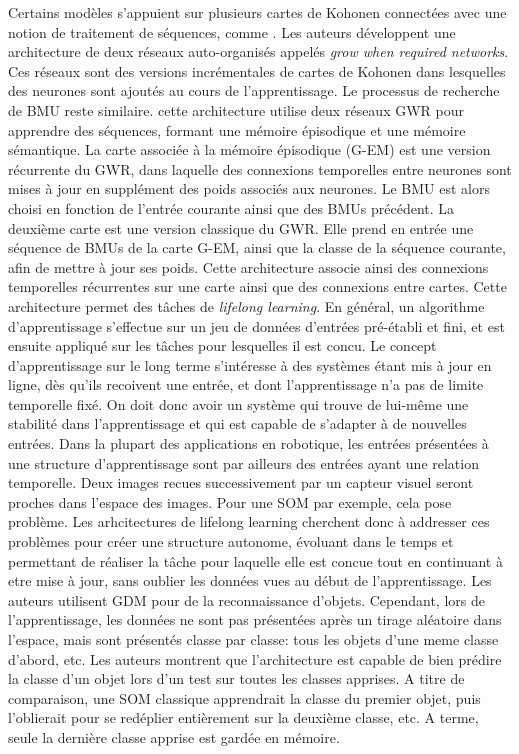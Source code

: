 \documentclass[../main]{subfiles}
\begin{document}
Certains modèles s'appuient sur plusieurs cartes de Kohonen connectées avec une notion de traitement de séquences, comme \cite{parisiLL}. Les auteurs développent une architecture de deux réseaux auto-organisés appelés \emph{grow when required networks}. Ces réseaux sont des versions incrémentales de cartes de Kohonen dans lesquelles des neurones sont ajoutés au cours de l'apprentissage. Le processus de recherche de BMU reste similaire.
cette architecture utilise deux réseaux GWR pour apprendre des séquences, formant une mémoire épisodique et une mémoire sémantique.
La carte associée à la mémoire épisodique (G-EM) est une version récurrente du GWR, dans laquelle des connexions temporelles entre neurones sont mises à jour en supplément des poids associés aux neurones. Le BMU est alors choisi en fonction de l'entrée courante ainsi que des BMUs précédent. 
La deuxième carte est une version classique du GWR. Elle prend en entrée une séquence de BMUs de la carte G-EM, ainsi que la classe de la séquence courante, afin de mettre à jour ses poids. 
Cette architecture associe ainsi des connexions temporelles récurrentes sur une carte ainsi que des connexions entre cartes.
Cette architecture permet des tâches de \emph{lifelong learning}. En général, un algorithme d'apprentissage s'effectue sur un jeu de données d'entrées pré-établi et fini, et est ensuite appliqué sur les tâches pour lesquelles il est concu.
Le concept d'apprentissage sur le long terme s'intéresse à des systèmes étant mis à jour en ligne, dès qu'ils recoivent une entrée, et dont l'apprentissage n'a pas de limite temporelle fixé. On doit donc avoir un système qui trouve de lui-même une stabilité dans l'apprentissage et qui est capable de s'adapter à de nouvelles entrées.
Dans la plupart des applications en robotique, les entrées présentées à une structure d'apprentissage sont par ailleurs des entrées ayant une relation temporelle. Deux images recues successivement par un capteur visuel seront proches dans l'espace des images. Pour une SOM par exemple, cela pose problème. Les arhcitectures de lifelong learning cherchent donc à addresser ces problèmes pour créer une structure autonome, évoluant dans le temps et permettant de réaliser la tâche pour laquelle elle est concue tout en continuant à etre mise à jour, sans oublier les données vues au début de l'apprentissage.
Les auteurs utilisent GDM pour de la reconnaissance d'objets. Cependant, lors de l'apprentissage, les données ne sont pas présentées après un tirage aléatoire dans l'espace, mais sont présentés classe par classe: tous les objets d'une meme classe d'abord, etc. Les auteurs montrent que l'architecture est capable de bien prédire la classe d'un objet lors d'un test sur toutes les classes apprises. A titre de comparaison, une SOM classique apprendrait la classe du premier objet, puis l'oblierait pour se redéplier entièrement sur la deuxième classe, etc. A terme, seule la dernière classe apprise est gardée en mémoire.
\end{document}
